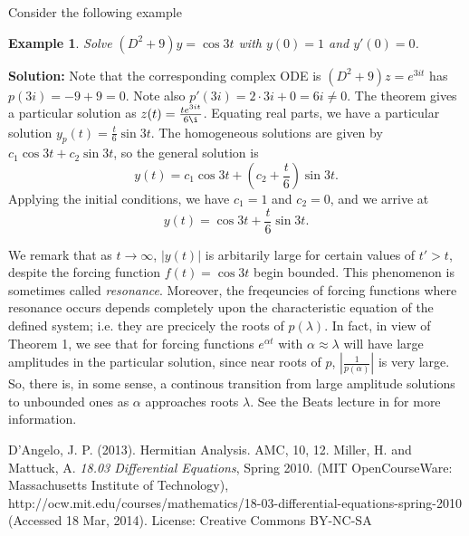 \documentclass{homework} %
\newtheorem{ex}{Example}
\begin{document}
Consider the following example
\begin{ex}
  Solve $(D^2 + 9)y = \cos 3t$ with $y(0) = 1$ and $y'(0) = 0$.
\end{ex}
{\bf Solution:}
Note that the corresponding complex ODE is $(D^2 + 9)z = e^{3it}$ has $p(3i) = -9 + 9 =0$.  Note also $p'(3i) = 2\cdot 3i + 0 = 6i \not= 0$.  The theorem gives a particular solution as $z(t) = \frac{ te^{3it} }{ 6\i }$.  Equating real parts, we have a particular solution $y_p(t) = \frac t6 \sin 3t$.  The homogeneous solutions are given by $c_1 \cos 3t + c_2 \sin 3t$, so the general solution is
$$
  y(t) = c_1 \cos 3t + \left(c_2 + \frac t6\right) \sin 3t.
$$
Applying the initial conditions, we have $c_1 = 1$ and $c_2 = 0$, and we arrive at
$$
  y(t) = \cos 3t + \frac t6 \sin 3t.
$$

We remark that as $t\to \infty$, $|y(t)|$ is arbitarily large for certain values of $t' > t$, despite the forcing function $f(t) = \cos 3t$ begin bounded. This phenomenon is sometimes called \emph{resonance}. Moreover, the freqeuncies of forcing functions where resonance occurs depends completely upon the characteristic equation of the defined system; i.e. they are precicely the roots of $p(\lambda)$.  In fact, in view of Theorem 1, we see that for forcing functions $e^{\alpha t}$ with $\alpha \approx \lambda$ will have large amplitudes in the particular solution, since near roots of $p$, $\left| \frac 1{p(\alpha)} \right|$ is very large.  So, there is, in some sense, a continous transition from large amplitude solutions to unbounded ones as $\alpha$ approaches roots $\lambda$.  See the Beats lecture in \cite{mit} for more information.

\begin{thebibliography}{1}
     D'Angelo, J. P. (2013). Hermitian Analysis. AMC, 10, 12.
     Miller, H. and Mattuck, A. \emph{18.03 Differential Equations}, Spring 2010. (MIT OpenCourseWare: Massachusetts Institute of Technology), \\http://ocw.mit.edu/courses/mathematics/18-03-differential-equations-spring-2010\\ (Accessed 18 Mar, 2014). License: Creative Commons BY-NC-SA
    \end{thebibliography}
\end{document}
